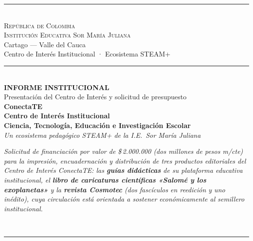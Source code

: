 \documentclass[12pt, letterpaper]{article}
\newcommand{\pesos}[1]{\$\,#1}
\begin{document}
\thispagestyle{empty}
\begin{center}
{\color{smjAzul}\rule{\linewidth}{2.2pt}}\\[0.2cm]
{\large\textsc{\color{smjAzul} República de Colombia}}\\[0.05cm]
{\large\textsc{\color{smjAzul} Institución Educativa Sor María Juliana}}\\[0.05cm]
{\normalsize\color{smjVino} Cartago — Valle del Cauca}\\[0.10cm]
{\small\color{smjDorado!80!black} Centro de Interés Institucional · Ecosistema STEAM+}\\[0.25cm]
{\color{smjDorado}\rule{\linewidth}{1pt}}\\[1.3cm]

{\large\bfseries\color{smjVino} INFORME INSTITUCIONAL}\\[0.2cm]
{\small\color{smjAzul} Presentación del Centro de Interés y solicitud de presupuesto}\\[1.0cm]

{\Huge\bfseries\color{smjAzul} ConectaTE}\\[0.25cm]
{\Large\bfseries\color{smjAzul} Centro de Interés Institucional}\\[0.10cm]
{\large\bfseries\color{smjVino} Ciencia, Tecnología, Educación e Investigación Escolar}\\[0.10cm]
{\normalsize\itshape\color{smjVino}Un ecosistema pedagógico STEAM+ de la I.E.\ Sor María Juliana}\\[0.9cm]

\begin{minipage}{0.90\textwidth}\centering
{\itshape\color{smjAzul}\normalsize
Solicitud de financiación por valor de \pesos{2.000.000} (dos millones de pesos m/cte) para la \mbox{impresión}, encuadernación y distribución de tres productos editoriales del Centro de Interés ConectaTE: las \textbf{guías didácticas} de su plataforma educativa institucional, el \textbf{libro de caricaturas científicas «Salomé y los exoplanetas»} y la \textbf{revista Cosmotec} (dos fascículos en reedición y uno inédito), cuya circulación está orientada a sostener económicamente al semillero institucional.}
\end{minipage}\\[1.1cm]

{\color{smjDorado}\rule{0.5\linewidth}{0.5pt}}\\[0.6cm]


\end{center}
\end{document}
